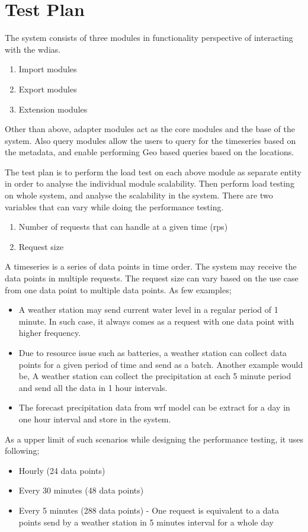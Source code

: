 \section{Test Plan}
The system consists of three modules in functionality perspective of interacting with the \acrshort{wdias}.
\begin{enumerate}
    \item Import modules
    \item Export modules
    \item Extension modules
\end{enumerate}
Other than above, adapter modules act as the core modules and the base of the system. Also query modules allow the users to query for the timeseries
based on the metadata, and enable performing Geo based queries based on the locations.

The test plan is to perform the load test on each above module as separate entity in order to analyse the individual module scalability.
Then perform load testing on whole system, and analyse the scalability in the system. There are two variables that can vary while doing the performance testing.
\begin{enumerate}
    \item Number of requests that can handle at a given time (\acrfull{rps})
    \item Request size
\end{enumerate}
A timeseries is a series of data points in time order. The system may receive the data points in multiple requests.
The request size can vary based on the use case from one data point to multiple data points. As few examples;
\begin{itemize}
    \item A weather station may send current water level in a regular period of 1 minute. In such case, it always comes as a request with one data point with higher frequency.
    \item Due to resource issue such as batteries, a weather station can collect data points for a given period of time and send as a batch. Another example would be,
A weather station can collect the precipitation at each 5 minute period and send all the data in 1 hour intervals.
    \item The forecast precipitation data from \acrshort{wrf} model can be extract for a day in one hour interval and store in the system.
\end{itemize}

As a upper limit of such scenarios while designing the performance testing, it uses following;
\begin{itemize}
    \item Hourly (24 data points) 
    \item Every 30 minutes (48 data points)
    \item Every 5 minutes (288 data points) - One request is equivalent to a data points send by a weather station in 5 minutes interval for a whole day
\end{itemize}

